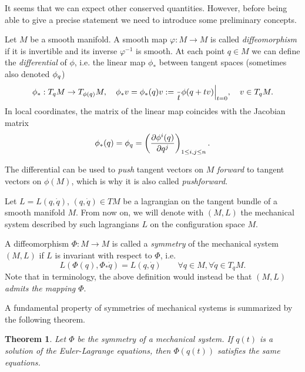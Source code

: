 \documentclass[english,fontsize=11pt,paper=a5,oneside]{scrbook}
\let\d\relax
\DeclareMathOperator{\d}{d}
\newtheorem{theorem}{Theorem}[chapter]
\theoremstyle{definition}
\begin{document}
It seems that we can expect other conserved quantities. However, before being able to give a precise statement we need to introduce some preliminary concepts.

Let $M$ be a smooth manifold. A smooth map $\varphi : M \to M$ is called \emph{diffeomorphism} if it is invertible and its inverse $\varphi^{-1}$ is smooth. At each point $q\in M$ we can define the \emph{differential} of $\phi$, i.e. the linear map $\phi_*$ between tangent spaces (sometimes also denoted $\d\phi_q$)
\begin{equation}
    \phi_*: T_q M \to T_{\phi(q)} M,
    \quad \phi_* v = \phi_*(q) v := \frac{\d}{\d t} \phi(q + t v) \Big|_{t=0},
    \quad v\in T_q M.
\end{equation}
In local coordinates, the matrix of the linear map coincides with the Jacobian matrix
\begin{equation}
   \phi_*(q) = \d \phi_q = \left(\frac{\partial \phi^i(q)}{\partial q^j}\right)_{1\leq i,j\leq n}.
\end{equation}

The differential can be used to \emph{push} tangent vectors on $M$ \emph{forward} to tangent vectors on $\phi(M)$, which is why it is also called \emph{pushforward}.

\begin{tcolorbox}
    Let $L = L(q, \dot q)$, $(q, \dot q)\in TM$ be a lagrangian on the tangent bundle of a smooth manifold $M$. From now on, we will denote with $(M, L)$ the mechanical system described by such lagrangians $L$ on the configuration space $M$. 
\end{tcolorbox}

A diffeomorphism $\Phi: M \to M$ is called a \emph{symmetry} of the mechanical system $(M,L)$ if $L$ is invariant with respect to $\Phi$, i.e.
\begin{equation}\label{eq:symmetry}
    L\left(\Phi(q), \Phi_*\dot q\right) = L(q,\dot q) \qquad \forall q\in M, \forall\dot q \in T_q M.
\end{equation}
Note that in \cite[Chapter 4]{book:arnold} terminology, the above definition would instead be that \emph{$(M,L)$ admits the mapping $\Phi$}.

A fundamental property of symmetries of mechanical systems is summarized by the following theorem.

\begin{theorem}
    Let $\Phi$ be the symmetry of a mechanical system. If $q(t)$ is a solution of the Euler-Lagrange equations, then $\Phi(q(t))$ satisfies the same equations.
\end{theorem}
\end{document}
